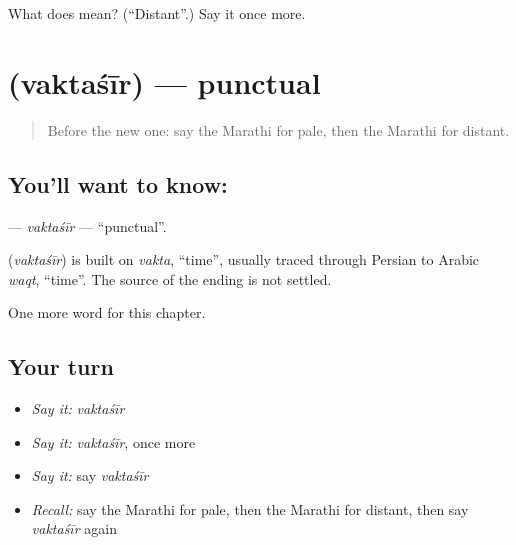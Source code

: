 \begin{tcolorbox}[breakable,colback=teal!4,colframe=teal!35!black,title={Before you move on}]
What does  mean? (\textquotedblleft{}Distant\textquotedblright{}.) Say it once more.
\end{tcolorbox}
\section[\texorpdfstring{\mr{वक्तशीर} (vaktaśīr)}{वक्तशीर (vaktaśīr)}]{ (vaktaśīr) — punctual}

\label{lesson:MR-C233-vaktasir}



\begin{quote}
Before the new one: say the Marathi for pale, then the Marathi for distant.
\end{quote}

\subsection*{You'll want to know: }
\textbf{} — \emph{vaktaśīr} — \textquotedblleft{}punctual\textquotedblright{}.

\begin{cousinweb}
\textbf{} (\emph{vaktaśīr}) is built on \emph{vakta}, \textquotedblleft{}time\textquotedblright{}, usually traced through Persian to Arabic \emph{waqt}, \textquotedblleft{}time\textquotedblright{}. The source of the ending is not settled.
\end{cousinweb}

\begin{grammarlens}[title={What you've built}]
One more word for this chapter.
\end{grammarlens}

\subsection*{Your turn}
\begin{itemize}
\raggedright
  \item \emph{Say it:} \emph{vaktaśīr}
  \item \emph{Say it:} \emph{vaktaśīr}, once more
  \item \emph{Say it:} say \emph{vaktaśīr}
  \item \emph{Recall:} say the Marathi for pale, then the Marathi for distant, then say \emph{vaktaśīr} again
\end{itemize}

